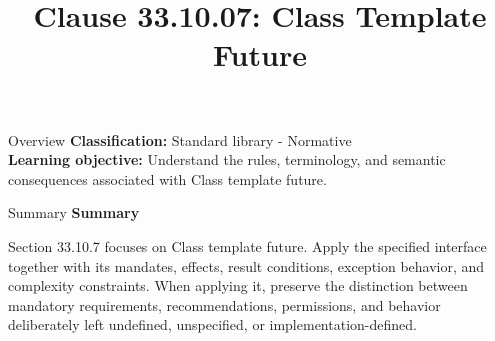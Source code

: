 \documentclass[10pt,letterpaper]{article}
\title{Clause 33.10.07: Class Template Future}
\author{}
\date{}
\begin{document}
\maketitle
\begin{CornellOverviewBox}{Overview}
\textbf{Classification:} Standard library - Normative\\[2pt]
\textbf{Learning objective:} Understand the rules, terminology, and semantic consequences associated with Class template future.
\end{CornellOverviewBox}\begin{CornellSummaryBox}{Summary}
{\sffamily\bfseries\color{Accent} Summary}\par\vspace{3pt}Section 33.10.7 focuses on Class template future. Apply the specified interface together with its mandates, effects, result conditions, exception behavior, and complexity constraints. When applying it, preserve the distinction between mandatory requirements, recommendations, permissions, and behavior deliberately left undefined, unspecified, or implementation-defined.
\end{CornellSummaryBox}
\end{document}
